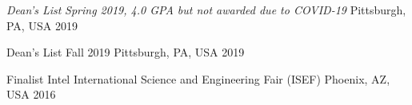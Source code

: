 






\begin{cvhonors}

\cvhonor
{\emph{Dean's List}} %
{\emph{Spring 2019, 4.0 GPA but not awarded due to COVID-19} } %
{Pittsburgh, PA, USA} %
{2019} %

\cvhonor
{Dean's List} %
{Fall 2019} %
{Pittsburgh, PA, USA} %
{2019} %

\end{cvhonors}




\begin{cvhonors}

\cvhonor
{Finalist} %
{Intel International Science and Engineering Fair (ISEF)} %
{Phoenix, AZ, USA} %
{2016} %


\end{cvhonors}



